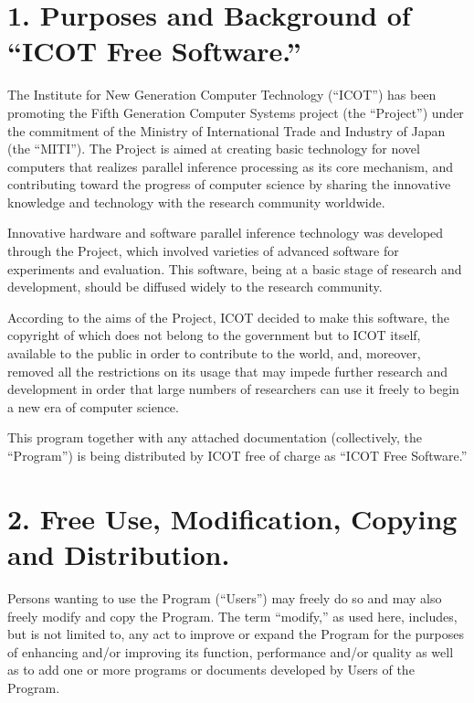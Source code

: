{\medskip

\section*{1. Purposes and Background of ``ICOT Free Software.''}

     The Institute for New Generation Computer Technology (``ICOT'')
has been promoting the Fifth Generation Computer Systems project (the
``Project'') under the commitment of the Ministry of International
Trade and Industry of Japan (the ``MITI'').  The Project is aimed at
creating basic technology for novel computers that realizes parallel
inference processing as its core mechanism, and contributing toward
the progress of computer science by sharing the innovative knowledge
and technology with the research community worldwide.

    Innovative hardware and software parallel inference technology was
developed through the Project, which involved varieties of advanced
software for experiments and evaluation.  This software, being at a
basic stage of research and development, should be diffused widely to
the research community.

    According to the aims of the Project, ICOT decided to make this
software, the copyright of which does not belong to the government but
to ICOT itself, available to the public in order to contribute to the
world, and, moreover, removed all the restrictions on its usage that
may impede further research and development in order that large
numbers of researchers can use it freely to begin a new era of
computer science.

    This program together with any attached documentation
(collectively, the ``Program'') is being distributed by ICOT free of
charge as ``ICOT Free Software.''

\medskip

\section*{2. Free Use, Modification, Copying and Distribution.}

    Persons wanting to use the Program (``Users'') may freely do so
and may also freely modify and copy the Program. The term ``modify,''
as used here, includes, but is not limited to, any act to improve or
expand the Program for the purposes of enhancing and/or improving its
function, performance and/or quality as well as to add one or more
programs or documents developed by Users of the Program.

}
